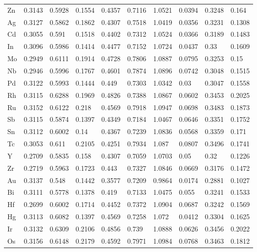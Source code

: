 \begin{table}[h]
{\begin{tabular}{*{10}{l}}
      Zn & 0.3143 & 0.5928 & 0.1554 & 0.4357 & 0.7116 & 1.0521 & 0.0394 & 0.3248 & 0.164  \\
      Ag & 0.3127 & 0.5862 & 0.1862 & 0.4307 & 0.7518 & 1.0419 & 0.0356 & 0.3231 & 0.1308 \\
      Cd & 0.3055 & 0.591  & 0.1518 & 0.4402 & 0.7312 & 1.0524 & 0.0366 & 0.3189 & 0.1483 \\
      In & 0.3096 & 0.5986 & 0.1414 & 0.4477 & 0.7152 & 1.0724 & 0.0437 & 0.33   & 0.1609 \\
      Mo & 0.2949 & 0.6111 & 0.1914 & 0.4728 & 0.7806 & 1.0887 & 0.0795 & 0.3253 & 0.15   \\
      Nb & 0.2946 & 0.5996 & 0.1767 & 0.4601 & 0.7874 & 1.0896 & 0.0742 & 0.3048 & 0.1515 \\
      Pd & 0.3122 & 0.5993 & 0.1444 & 0.449  & 0.7303 & 1.0342 & 0.03   & 0.3047 & 0.1558 \\
      Rh & 0.3115 & 0.6288 & 0.1969 & 0.4826 & 0.7388 & 1.0867 & 0.0602 & 0.3453 & 0.2025 \\
      Ru & 0.3152 & 0.6122 & 0.218  & 0.4569 & 0.7918 & 1.0947 & 0.0698 & 0.3483 & 0.1873 \\
      Sb & 0.3115 & 0.5874 & 0.1397 & 0.4349 & 0.7184 & 1.0467 & 0.0646 & 0.3351 & 0.1752 \\
      Sn & 0.3112 & 0.6002 & 0.14   & 0.4367 & 0.7239 & 1.0836 & 0.0568 & 0.3359 & 0.171  \\
      Tc & 0.3053 & 0.611  & 0.2105 & 0.4251 & 0.7934 & 1.087  & 0.0807 & 0.3496 & 0.1741 \\
      Y  & 0.2709 & 0.5835 & 0.158  & 0.4307 & 0.7059 & 1.0703 & 0.05   & 0.32   & 0.1226 \\
      Zr & 0.2719 & 0.5963 & 0.1723 & 0.443  & 0.7327 & 1.0846 & 0.0669 & 0.3176 & 0.1472 \\
      Au & 0.3137 & 0.548  & 0.1442 & 0.3577 & 0.7209 & 0.9864 & 0.0174 & 0.2881 & 0.1027 \\
      Bi & 0.3111 & 0.5778 & 0.1378 & 0.419  & 0.7133 & 1.0475 & 0.055  & 0.3241 & 0.1533 \\
      Hf & 0.2699 & 0.6002 & 0.1714 & 0.4452 & 0.7372 & 1.0904 & 0.0687 & 0.3242 & 0.1569 \\
      Hg & 0.3113 & 0.6082 & 0.1397 & 0.4569 & 0.7258 & 1.072  & 0.0412 & 0.3304 & 0.1625 \\
      Ir & 0.3132 & 0.6309 & 0.2106 & 0.4856 & 0.739  & 1.0888 & 0.0626 & 0.3456 & 0.2022 \\
      Os & 0.3156 & 0.6148 & 0.2179 & 0.4592 & 0.7971 & 1.0984 & 0.0768 & 0.3463 & 0.1812 \\

\end{tabular}}
\end{table}
